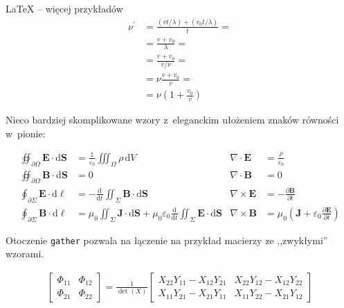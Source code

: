\begin{easyappendix}{\LaTeX{} -- więcej przykładów}
\begin{align}
	\nu^\prime  &= \frac{\left(vt / \lambda \right) + \left( v_0t / \lambda \right)}{t} = \nonumber\\
	&= \frac{v + v_0}{\lambda} = \nonumber\\
	&= \frac{v + v_0}{v / \nu} = \nonumber\\
	&= \nu \frac{v+v_0}{v} = \nonumber\\
	&= \nu \left( 1 + \frac{v_0}{v} \right)
\end{align}

Nieco bardziej skomplikowane wzory z~eleganckim ułożeniem znaków równości w~pionie:

\begin{align}
	\oiint\nolimits_{\partial \Omega} \pmb{E} \cdot \mathrm{d}\pmb{S} &= \frac{1}{\varepsilon_0} \iiint\nolimits_\Omega \rho \, \mathrm{d}V &  \nabla \cdot \pmb{E} &= \frac {\rho} {\varepsilon_0} \label{eq:maxwell1} \\
	\oiint\nolimits_{\partial \Omega} \pmb{B} \cdot \mathrm{d}\pmb{S} &= 0 & \nabla \cdot \pmb{B} &= 0 \label{eq:maxwell2} \\
	\oint\nolimits_{\partial \Sigma} \pmb{E} \cdot \mathrm{d}\boldsymbol{\ell} &= -\frac{\mathrm{d}}{\mathrm{d}t}\iint\nolimits_{\Sigma}\pmb{B}\cdot\mathrm{d}\pmb{S} & \nabla \times \pmb{E} &= -\frac{\partial \pmb{B}}{\partial t} \label{eq:maxwell3} \\
	\oint\nolimits_{\partial \Sigma} \pmb{B} \cdot \mathrm{d}\boldsymbol{\ell} &= \mu_0 \iint\nolimits_{\Sigma} \pmb{J} \cdot \mathrm{d}\pmb{S} + \mu_0 \varepsilon_0 \frac{\mathrm{d}}{\mathrm{d}t} \iint\nolimits_{\Sigma} \pmb{E} \cdot \mathrm{d}\pmb{S} & \nabla \times \pmb{B} &= \mu_0\left(\pmb{J} + \varepsilon_0 \frac{\partial \pmb{E}} {\partial t} \right) \label{eq:maxwell4}
\end{align}

Otoczenie \texttt{gather} pozwala na łączenie na przykład macierzy ze ,,zwykłymi'' wzorami.

\begin{gather}
	\begin{bmatrix} \Phi_{11} & \Phi_{12} \\ \Phi_{21} & \Phi_{22} \end{bmatrix}
	=
	\frac{1}{\det(X)}
	\begin{bmatrix}
		X_{22} Y_{11} - X_{12} Y_{21} &
		X_{22} Y_{12} - X_{12} Y_{22} \\
		X_{11} Y_{21} - X_{21} Y_{11} &
		X_{11} Y_{22} - X_{21} Y_{12} 
	\end{bmatrix}
\end{gather}


\end{easyappendix}
